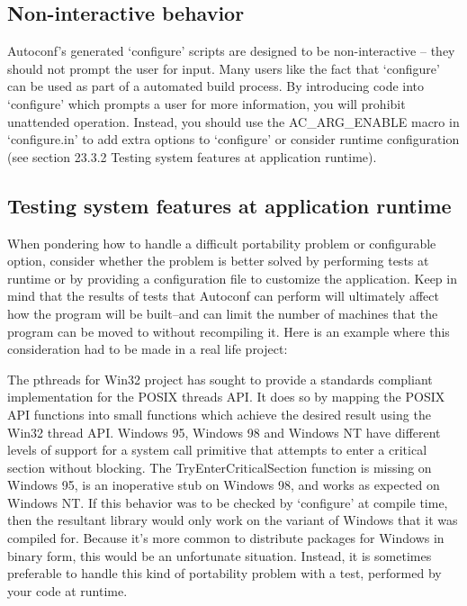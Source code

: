 \subsection{Non-interactive behavior}

Autoconf's generated `configure' scripts are designed to be non-interactive -- they should not prompt the user for input. Many users like the fact that `configure' can be used as part of a automated build process. By introducing code into `configure' which prompts a user for more information, you will prohibit unattended operation. Instead, you should use the AC\_{}ARG\_{}ENABLE macro in `configure.in' to add extra options to `configure' or consider runtime configuration (see section 23.3.2 Testing system features at application runtime). 

\subsection{Testing system features at application runtime}

When pondering how to handle a difficult portability problem or configurable option, consider whether the problem is better solved by performing tests at runtime or by providing a configuration file to customize the application. Keep in mind that the results of tests that Autoconf can perform will ultimately affect how the program will be built--and can limit the number of machines that the program can be moved to without recompiling it. Here is an example where this consideration had to be made in a real life project:

The pthreads for Win32 project has sought to provide a standards compliant implementation for the POSIX threads API. It does so by mapping the POSIX API functions into small functions which achieve the desired result using the Win32 thread API. Windows 95, Windows 98 and Windows NT have different levels of support for a system call primitive that attempts to enter a critical section without blocking. The TryEnterCriticalSection function is missing on Windows 95, is an inoperative stub on Windows 98, and works as expected on Windows NT. If this behavior was to be checked by `configure' at compile time, then the resultant library would only work on the variant of Windows that it was compiled for. Because it's more common to distribute packages for Windows in binary form, this would be an unfortunate situation. Instead, it is sometimes preferable to handle this kind of portability problem with a test, performed by your code at runtime. 

